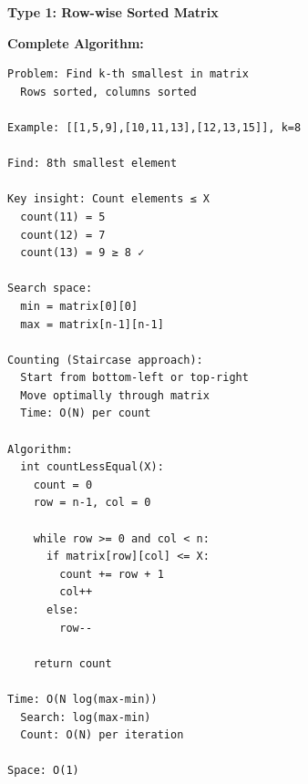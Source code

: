 \documentclass[11pt,a4paper,oneside]{book}
\begin{document}
\begin{tcolorbox}[
    enhanced,breakable,
    colback=successgreen!10,
    colframe=successgreen,
    boxrule=1.5pt,
    arc=3mm,
    title=\textbf{Complete Sorted Matrix Algorithms}
]
\textbf{Type 1: Row-wise Sorted Matrix}

\textbf{Complete Algorithm:}
\begin{verbatim}
Problem: Find k-th smallest in matrix
  Rows sorted, columns sorted
  
Example: [[1,5,9],[10,11,13],[12,13,15]], k=8
  
Find: 8th smallest element

Key insight: Count elements ≤ X
  count(11) = 5
  count(12) = 7
  count(13) = 9 ≥ 8 ✓

Search space:
  min = matrix[0][0]
  max = matrix[n-1][n-1]

Counting (Staircase approach):
  Start from bottom-left or top-right
  Move optimally through matrix
  Time: O(N) per count

Algorithm:
  int countLessEqual(X):
    count = 0
    row = n-1, col = 0
    
    while row >= 0 and col < n:
      if matrix[row][col] <= X:
        count += row + 1
        col++
      else:
        row--
    
    return count

Time: O(N log(max-min))
  Search: log(max-min)
  Count: O(N) per iteration

Space: O(1)
\end{verbatim}
\end{tcolorbox}
\end{document}
